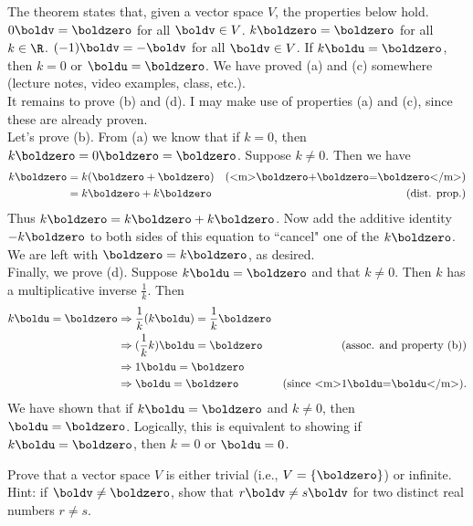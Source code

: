 \begin{solution}
\noindent
The theorem states that, given a vector space $V$, the properties below hold. 
\bb[(a)]
\ii $0\boldv=\boldzero$ for all $\boldv\in V$. 
\ii $k\boldzero=\boldzero$ for all $k\in \R$. 
\ii $(-1)\boldv=-\boldv$ for all $\boldv\in V$. 
\ii If $k\boldu=\boldzero$, then $k=0$ or $\boldu=\boldzero$. 
\ee
We have proved (a) and (c) somewhere (lecture notes, video examples, class, etc.).
\\
It remains to prove (b) and (d). I may make use of properties (a) and (c), since these are already proven. 
\\
Let's prove (b). From (a) we know that if $k=0$, then $k\boldzero=0\boldzero=\boldzero$. Suppose $k\ne 0$. Then we have 
\begin{align*}
k\boldzero&=k(\boldzero+\boldzero) &\text{(<m>\boldzero+\boldzero=\boldzero</m>)}\\
&=k\boldzero+k\boldzero &\text{(dist. prop.)}
\end{align*}
Thus $k\boldzero=k\boldzero+k\boldzero$. Now add the additive identity $-k\boldzero$ to both sides of this equation to ``cancel" one of the $k\boldzero$. We are left with $\boldzero=k\boldzero$, as desired. 
\vspace{.1in}
\\
Finally, we prove (d). Suppose $k\boldu=\boldzero$ and that $k\ne 0$. Then $k$ has a multiplicative inverse $\frac{1}{k}$. Then 
\begin{align*}
k\boldu=\boldzero&\Rightarrow \frac{1}{k}(k\boldu)=\frac{1}{k}\boldzero\\
&\Rightarrow (\frac{1}{k}k)\boldu=\boldzero &\text{(assoc. and property (b))}\\
&\Rightarrow 1\boldu=\boldzero\\
&\Rightarrow \boldu=\boldzero &\text{(since <m>1\boldu=\boldu</m>)}.
\end{align*}
We have shown that if $k\boldu=\boldzero$ and $k\ne 0$, then $\boldu=\boldzero$. Logically, this is equivalent to showing if $k\boldu=\boldzero$, then $k=0$ or $\boldu=0$. 
\end{solution}
\ii Prove that a vector space $V$ is either trivial (i.e., $V=\{\boldzero\}$) or infinite. Hint: if $\boldv\ne\boldzero$, show that $r\boldv\ne s\boldv$ for two distinct real numbers $r\ne s$. 
